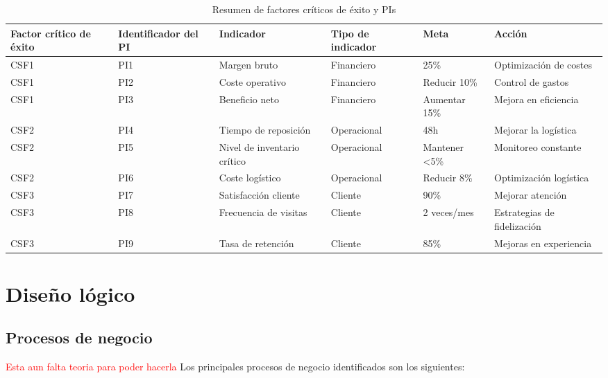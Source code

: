 \documentclass[12pt]{opticajnl}
\begin{document}
\begin{table}[H]
\centering
\begin{tabular}{|p{2.5cm}|p{2cm}|p{3cm}|p{3.25cm}|p{2.5cm}|p{3cm}|}
\hline
\textbf{Factor crítico de éxito} & \textbf{Identificador del PI} & \textbf{Indicador} & \textbf{Tipo de indicador} & \textbf{Meta} & \textbf{Acción} \\ \hline
CSF1         & PI1                          & Margen bruto       & Financiero          & 25\%          & Optimización de costes \\ \hline
CSF1         & PI2                          & Coste operativo    & Financiero          & Reducir 10\%   & Control de gastos \\ \hline
CSF1       & PI3                          & Beneficio neto     & Financiero          & Aumentar 15\%  & Mejora en eficiencia \\ \hline
CSF2 & PI4                         & Tiempo de reposición & Operacional         & 48h          & Mejorar la logística \\ \hline
CSF2 & PI5                         & Nivel de inventario crítico & Operacional  & Mantener <5\% & Monitoreo constante \\ \hline
CSF2 & PI6                         & Coste logístico    & Operacional         & Reducir 8\%    & Optimización logística \\ \hline
CSF3   & PI7                          & Satisfacción cliente & Cliente           & 90\%         & Mejorar atención \\ \hline
CSF3   & PI8                          & Frecuencia de visitas & Cliente          & 2 veces/mes  & Estrategias de fidelización \\ \hline
CSF3   & PI9                          & Tasa de retención  & Cliente             & 85\%          & Mejoras en experiencia \\ \hline
\end{tabular}
\caption{Resumen de factores críticos de éxito y PIs}
\end{table}


\newpage

\section{Diseño lógico}

\subsection{Procesos de negocio}
\textcolor{red}{Esta aun falta teoria para poder hacerla}
Los principales procesos de negocio identificados son los siguientes:
\end{document}
